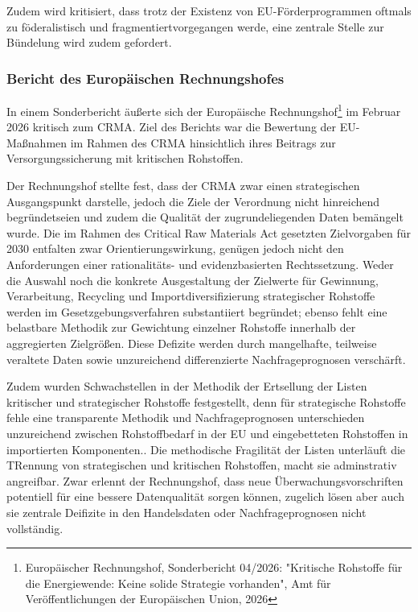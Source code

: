 \documentclass[12pt,a4paper,oneside]{book} %
\begin{document}
Zudem wird kritisiert, dass trotz der Existenz von EU-Förderprogrammen oftmals \glqq zu föderalistisch und fragmentiert\grqq vorgegangen werde, eine zentrale Stelle zur Bündelung wird zudem gefordert.\autocite{Je länger die EU untätig bleibt, umso verwundbarer macht sie sich}


\subsubsection{Bericht des Europäischen Rechnungshofes}

In einem Sonderbericht äußerte sich der Europäische Rechnungshof\footnote{Europäischer Rechnungshof, Sonderbericht 04/2026: "Kritische Rohstoffe für die Energiewende: Keine solide Strategie vorhanden", Amt für Veröffentlichungen der Europäischen Union, 2026} im Februar 2026 kritisch zum CRMA. Ziel des Berichts war die Bewertung der EU-Maßnahmen im Rahmen des CRMA hinsichtlich ihres Beitrags zur Versorgungssicherung mit kritischen Rohstoffen.

Der Rechnungshof stellte fest, dass der CRMA zwar einen strategischen Ausgangspunkt darstelle, jedoch die Ziele der Verordnung \glqq nicht hinreichend begründet\grqq seien und zudem die Qualität der zugrundeliegenden Daten bemängelt wurde.\autocite{S. 7} Die im Rahmen des Critical Raw Materials Act gesetzten Zielvorgaben für 2030 entfalten zwar Orientierungswirkung, genügen jedoch nicht den Anforderungen einer rationalitäts- und evidenzbasierten Rechtssetzung. Weder die Auswahl noch die konkrete Ausgestaltung der Zielwerte für Gewinnung, Verarbeitung, Recycling und Importdiversifizierung strategischer Rohstoffe werden im Gesetzgebungsverfahren substantiiert begründet; ebenso fehlt eine belastbare Methodik zur Gewichtung einzelner Rohstoffe innerhalb der aggregierten Zielgrößen. Diese Defizite werden durch mangelhafte, teilweise veraltete Daten sowie unzureichend differenzierte Nachfrageprognosen verschärft.

Zudem wurden Schwachstellen in der Methodik der Ertsellung der Listen kritischer und strategischer Rohstoffe festgestellt, denn für strategische Rohstoffe fehle eine transparente Methodik und Nachfrageprognosen unterschieden unzureichend zwischen Rohstoffbedarf in der EU und eingebetteten Rohstoffen in importierten Komponenten.. Die methodische Fragilität der Listen unterläuft die TRennung von strategischen und kritischen Rohstoffen, macht sie adminstrativ angreifbar. Zwar erlennt der Rechnungshof, dass neue Überwachungsvorschriften potentiell für eine bessere Datenqualität sorgen können, zugelich lösen aber auch sie zentrale Deifizite in den Handelsdaten oder Nachfrageprognosen nicht vollständig. 
\end{document}
